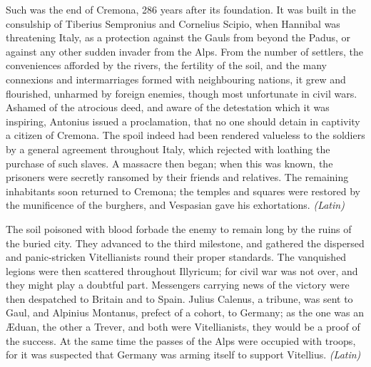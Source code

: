
Such was the end of Cremona, 286 years after its foundation. It was built in the consulship of Tiberius Sempronius and Cornelius Scipio, when Hannibal was threatening Italy, as a protection against the Gauls from beyond the Padus, or against any other sudden invader from the Alps. From the number of settlers, the conveniences afforded by the rivers, the fertility of the soil, and the many connexions and intermarriages formed with neighbouring nations, it grew and flourished, unharmed by foreign enemies, though most unfortunate in civil wars. Ashamed of the atrocious deed, and aware of the detestation which it was inspiring, Antonius issued a proclamation, that no one should detain in captivity a citizen of Cremona. The spoil indeed had been rendered valueless to the soldiers by a general agreement throughout Italy, which rejected with loathing the purchase of such slaves. A massacre then began; when this was known, the prisoners were secretly ransomed by their friends and relatives. The remaining inhabitants soon returned to Cremona; the temples and squares were restored by the munificence of the burghers, and Vespasian gave his exhortations. \emph{(Latin)}


The soil poisoned with blood forbade the enemy to remain long by the ruins of the buried city. They advanced to the third milestone, and gathered the dispersed and panic-stricken Vitellianists round their proper standards. The vanquished legions were then scattered throughout Illyricum; for civil war was not over, and they might play a doubtful part. Messengers carrying news of the victory were then despatched to Britain and to Spain. Julius Calenus, a tribune, was sent to Gaul, and Alpinius Montanus, prefect of a cohort, to Germany; as the one was an Æduan, the other a Trever, and both were Vitellianists, they would be a proof of the success. At the same time the passes of the Alps were occupied with troops, for it was suspected that Germany was arming itself to support Vitellius. \emph{(Latin)}


